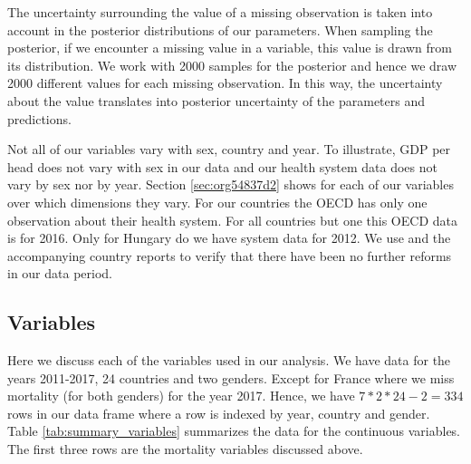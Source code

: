 \documentclass[a4paper,12pt]{article}
\begin{document}
The uncertainty surrounding the value of a missing observation is taken into account in the posterior distributions of our parameters. When sampling the posterior, if we encounter a missing value in a variable, this value is drawn from its distribution. We work with 2000 samples for the posterior and hence we draw 2000 different values for each missing observation. In this way, the uncertainty about the value translates into posterior uncertainty of the parameters and predictions.

Not all of our variables vary with sex, country and year. To illustrate, GDP per head does not vary with sex in our data and our health system data does not vary by sex nor by year. Section \ref{sec:org54837d2} shows for each of our variables over which dimensions they vary. For our countries the OECD has only one observation about their health system. For all countries but one this OECD data is for 2016. Only for Hungary do we have system data for 2012. We use \cite{countryprofileReport} and the accompanying country reports to verify that there have been no further reforms in our data period.


\subsection{Variables}
\label{sec:org5139003}

Here we discuss each of the variables used in our analysis. We have data for the years 2011-2017, 24 countries and two genders. Except for France where we miss mortality (for both genders) for the year 2017. Hence, we have \(7*2*24-2=334\) rows in our data frame where a row is indexed by year, country and gender. Table \ref{tab:summary_variables} summarizes the data for the continuous variables. The first three rows are the mortality variables discussed above.
\end{document}
